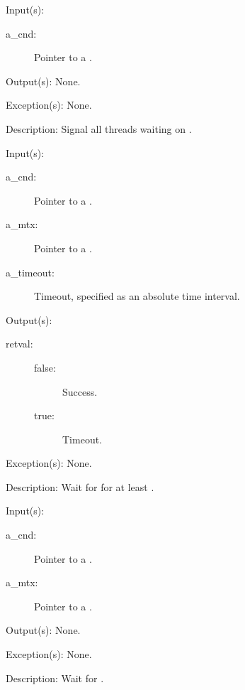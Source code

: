 \begin{capi}
	\begin{capilist}
	\item[Input(s): ]
		\begin{description}\item[]
		\item[a\_cnd: ]
			Pointer to a .
		\end{description}
	\item[Output(s): ] None.
	\item[Exception(s): ] None.
	\item[Description: ]
		Signal all threads waiting on .
	\end{capilist}
\label{cnd_timedwait}
	\begin{capilist}
	\item[Input(s): ]
		\begin{description}\item[]
		\item[a\_cnd: ]
			Pointer to a \classname{cnd}.
		\item[a\_mtx: ]
			Pointer to a \classname{mtx}.
		\item[a\_timeout: ]
			Timeout, specified as an absolute time interval.
		\end{description}
	\item[Output(s): ]
		\begin{description}\item[]
		\item[retval: ]
			\begin{description}\item[]
			\item[false: ] Success.
			\item[true: ] Timeout.
			\end{description}
		\end{description}
	\item[Exception(s): ] None.
	\item[Description: ]
		Wait for  for at least \cvar{a\_time}.
	\end{capilist}
\label{cnd_wait}
	\begin{capilist}
	\item[Input(s): ]
		\begin{description}\item[]
		\item[a\_cnd: ]
			Pointer to a .
		\item[a\_mtx: ]
			Pointer to a .
		\end{description}
	\item[Output(s): ] None.
	\item[Exception(s): ] None.
	\item[Description: ]
		Wait for \cvar{a\_cnd}.
	\end{capilist}
\end{capi}
